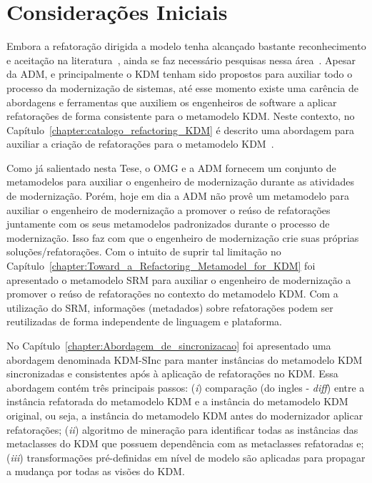 \section{Considerações Iniciais}

Embora a refatoração dirigida a modelo tenha alcançado bastante reconhecimento e aceitação na literatura~\cite{Moghadam_2012,Maneerat_2011,Fourati_2011,Einarsson_2012,Steimann_2015,Akiyama_2011, Jensen_2010,Arendt_2012,Millan_2009,Tom_2008_2008}, ainda se faz necessário pesquisas nessa área~\cite{durelli_systematic_mapping, revisao_sistematica_uml_refactoring}.
Apesar da ADM, e principalmente o KDM tenham sido propostos para auxiliar todo o processo da modernização de sistemas, até esse momento existe uma carência de abordagens e ferramentas que auxiliem os engenheiros de software a aplicar refatorações de forma consistente para o metamodelo KDM. Neste contexto, no Capítulo~\ref{chapter:catalogo_refactoring_KDM} é descrito uma abordagem para auxiliar a criação de refatorações para o metamodelo KDM~\cite{durelli_catalogo}. %


Como já salientado nesta Tese, o OMG e a ADM fornecem um conjunto de metamodelos para auxiliar o engenheiro de modernização durante as atividades de modernização. Porém, hoje em dia a ADM não provê um metamodelo para auxiliar o engenheiro de modernização a promover o reúso de refatorações juntamente com os seus metamodelos padronizados durante o processo de modernização. 
Isso faz com que o engenheiro de modernização crie suas próprias soluções/refatorações. Com o intuito de suprir tal limitação no Capítulo~\ref{chapter:Toward_a_Refactoring_Metamodel_for_KDM} foi apresentado o metamodelo SRM para auxiliar o engenheiro de modernização a promover o reúso de refatorações no contexto do metamodelo KDM. Com a utilização do SRM, informações (metadados) sobre refatorações podem ser reutilizadas de forma independente de linguagem e plataforma.

No Capítulo~\ref{chapter:Abordagem_de_sincronizacao} foi apresentado uma abordagem denominada KDM-SInc para manter instâncias do metamodelo KDM sincronizadas e consistentes após à aplicação de refatorações no KDM. Essa abordagem contém três principais passos: (\textit{i}) comparação (do ingles - \textit{diff}) entre a instância refatorada do metamodelo KDM e a instância do metamodelo KDM original, ou seja, a instância do metamodelo KDM antes do modernizador aplicar refatorações; (\textit{ii}) algoritmo de mineração para identificar todas as instâncias das metaclasses do KDM que possuem dependência com as metaclasses refatoradas e; (\textit{iii}) transformações pré-definidas em nível de modelo são aplicadas para propagar a mudança por todas as visões do KDM.

